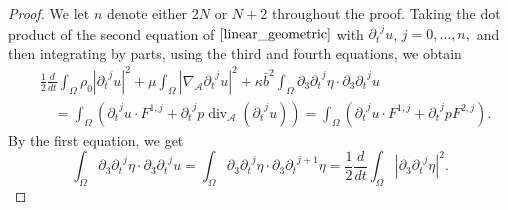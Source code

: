 \documentclass[a4paper,reqno,11pt]{amsart}
\numberwithin{equation}{section}
\providecommand{\abs}[1]{\left\vert#1\right\vert}
\begin{document}
\begin{proof}
We let $n$ denote either $2N$ or $N+2$ throughout the proof. Taking the dot product of the second equation of $\eqref{linear_geometric}$ with ${\partial_t}^j u$, $j=0,\dots,n,$ and then integrating by parts, using the third and fourth equations, we obtain
\begin{equation}\label{i_ge_ev_0}
\begin{split}
&{\frac{1}{2}}  \frac{d}{dt} \int_\Omega  \rho_0 \abs{{\partial_t}^j u}^2
+  \mu \int_\Omega \abs{ {{\nabla}_{\mathcal{A}}}{\partial_t}^j u}^2+\kappa\bar b^2\int_\Omega  {\partial}_{3} {\partial_t}^j\eta\cdot{\partial}_{3} {\partial_t}^j u
\\&\quad= \int_\Omega   (  {\partial_t}^j u\cdot F^{1,j}+  {\partial_t}^j p  \operatorname{div}_{\mathcal{A}} ({\partial_t}^j u))
 = \int_\Omega   (   {\partial_t}^j u\cdot F^{1,j}+  {\partial_t}^j p  F^{2,j}).
\end{split}
\end{equation}
By the first equation, we get
\begin{equation}\label{i_te_2}
 \int_\Omega  {\partial}_3 {\partial_t}^j\eta\cdot {\partial}_3 {\partial_t}^j u =  \int_\Omega  {\partial}_3 {\partial_t}^j\eta\cdot {\partial}_3 {\partial_t}^{j+1} \eta={\frac{1}{2}}\frac{d}{dt}\int_\Omega \abs{{\partial}_3{\partial_t}^j\eta}^2.
\end{equation}


\end{proof}
\end{document}
